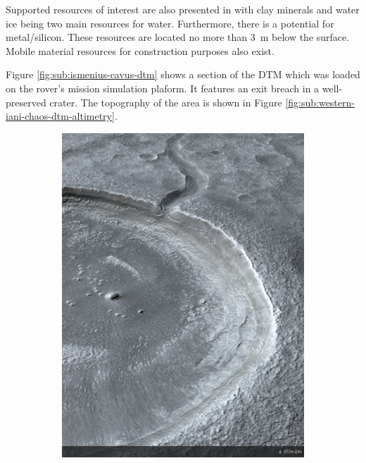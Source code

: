 Supported resources of interest are also presented in  with clay minerals and water ice being two main resources for water. Furthermore, there is a potential for metal/silicon. These resources are located no more than \SI{3}{\meter} below the surface. Mobile material resources for construction purposes also exist.

Figure \ref{fig:sub:ismenius-cavus-dtm} shows a section of the \ac{DTM} which was loaded on the rover's mission simulation plaform. It features an exit breach in a well-preserved crater. The topography of the area is shown in Figure \ref{fig:sub:western-iani-chaos-dtm-altimetry}.
\vspace{0.5cm}

\begin{figure}[h]
\captionsetup[subfigure]{justification=centering}
\vspace{-2ex}
	\centering
    \setlength{\subfigureWidth}{0.50\textwidth}
    \setlength{\graphicsHeight}{100mm}
    \hypersetup{hidelinks=true}%
    \begin{subfigure}[t]{\subfigureWidth}
        \centering
        \includegraphics[height=\graphicsHeight]{sections/mission-sites/images/ismenius-cavus-dtm.png}

\end{subfigure}
\end{figure}

